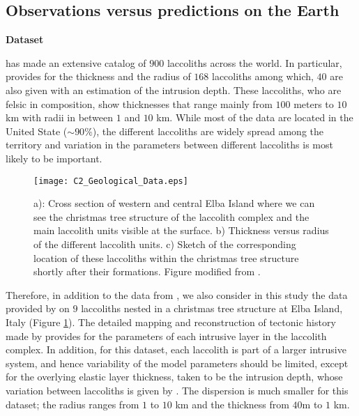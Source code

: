 \subsection{Observations versus predictions on the Earth}
\label{sec:observ-vs-pred}

\vspace{.5cm} \textbf{Dataset} \vspace{.5cm}

\citet{E:2015tl}  has made  an extensive  catalog of  $900$ laccoliths
across the  world.  In  particular, \citet{E:2015tl} provides  for the
thickness and  the radius  of $168$ laccoliths  among which,  $40$ are
also  given  with  an  estimation   of  the  intrusion  depth.   These
laccoliths, who are felsic in composition, show thicknesses that range
mainly from $100$ meters to $10$ km with radii in between $1$ and $10$
km.   While  most  of  the  data  are  located  in  the  United  State
($\sim 90\%$),  the different laccoliths  are widely spread  among the
territory and variation in the parameters between different laccoliths
is most likely to be important.
\begin{figure}[h!]
  \begin{center}
    \graphicspath{ {/Users/thorey/Documents/These/Manuscript/Figure/Chapter2/} }
    \texttt{[image: C2\_Geological\_Data.eps]}
    \caption{a):  Cross section  of  western and  central Elba  Island
      where we can  see the christmas tree structure  of the laccolith
      complex and the main laccolith  units visible at the surface. b)
      Thickness  versus radius  of the  different laccolith  units. c)
      Sketch of the corresponding  location of these laccoliths within
      the    christmas   tree    structure    shortly   after    their
      formations. Figure modified from \citet{Rocchi:2002jy}.}
    \label{C2_Geological_Data}
  \end{center}
\end{figure}

Therefore,  in addition  to the  data from  \citet{E:2015tl}, we  also
consider in this  study the data provided  by \citet{Rocchi:2002jy} on
$9$ laccoliths  nested in a  christmas tree structure at  Elba Island,
Italy  (Figure \ref{C2_Geological_Data}).   The  detailed mapping  and
reconstruction  of  tectonic  history  made  by  \citet{Rocchi:2002jy}
provides for the  parameters of each intrusive layer  in the laccolith
complex. In  addition, for this dataset,  each laccolith is part  of a
larger intrusive system, and hence variability of the model parameters
should be limited,  except for the overlying  elastic layer thickness,
taken to be the intrusion depth, whose variation between laccoliths is
given by  \citet{Rocchi:2002jy}.  The  dispersion is much  smaller for
this dataset; the radius ranges from  $1$ to $10$ km and the thickness
from $40$m to $1$ km.

